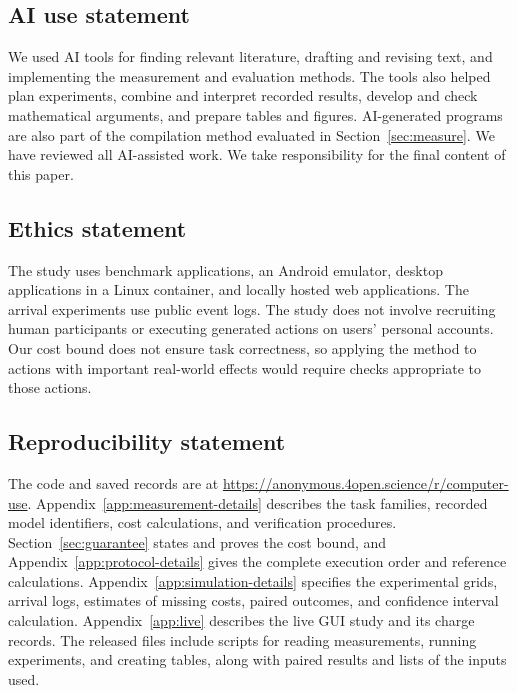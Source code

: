 \subsection*{AI use statement}
\label{sec:ai-use}
We used AI tools for finding relevant literature, drafting and revising text, and implementing the measurement and evaluation methods.
The tools also helped plan experiments, combine and interpret recorded results, develop and check mathematical arguments, and prepare tables and figures.
AI-generated programs are also part of the compilation method evaluated in Section~\ref{sec:measure}.
We have reviewed all AI-assisted work.
We take responsibility for the final content of this paper.

\subsection*{Ethics statement}
\label{sec:ethics}
The study uses benchmark applications, an Android emulator, desktop applications in a Linux container, and locally hosted web applications.
The arrival experiments use public event logs.
The study does not involve recruiting human participants or executing generated actions on users' personal accounts.
Our cost bound does not ensure task correctness, so applying the method to actions with important real-world effects would require checks appropriate to those actions.

\subsection*{Reproducibility statement}
\label{sec:reproducibility}
The code and saved records are at \url{https://anonymous.4open.science/r/computer-use}.
Appendix~\ref{app:measurement-details} describes the task families, recorded model identifiers, cost calculations, and verification procedures.
Section~\ref{sec:guarantee} states and proves the cost bound, and Appendix~\ref{app:protocol-details} gives the complete execution order and reference calculations.
Appendix~\ref{app:simulation-details} specifies the experimental grids, arrival logs, estimates of missing costs, paired outcomes, and confidence interval calculation.
Appendix~\ref{app:live} describes the live GUI study and its charge records.
The released files include scripts for reading measurements, running experiments, and creating tables, along with paired results and lists of the inputs used.

